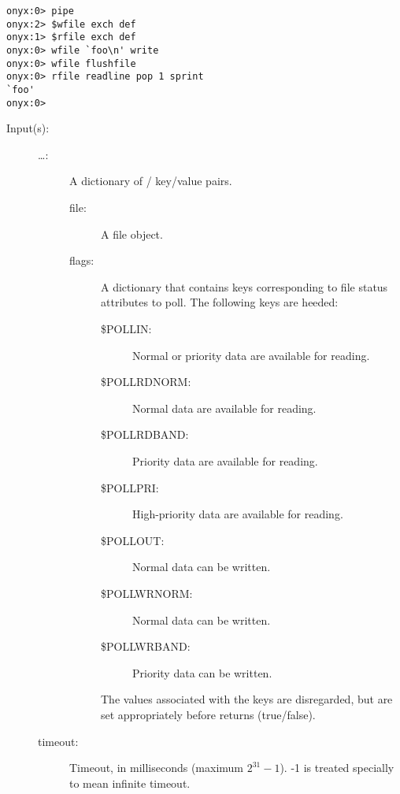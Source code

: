 \begin{description}
\begin{description}
\begin{verbatim}
onyx:0> pipe
onyx:2> $wfile exch def
onyx:1> $rfile exch def
onyx:0> wfile `foo\n' write
onyx:0> wfile flushfile
onyx:0> rfile readline pop 1 sprint
`foo'
onyx:0>
		\end{verbatim}
	\end{description}
\label{systemdict:poll}
\item[{\onyxop{{\lt}file flags \dots{\gt} timeout}{poll}{{\lb}file
      \dots{\rb}}}: ]
	\begin{description}\item[]
	\item[Input(s): ]
		\begin{description}\item[]
		\item[{\lt}\dots{\gt}: ]
			A dictionary of / key/value
			pairs.
			\begin{description}%
			\item[file: ]
				A file object.
			\item[flags: ]
				A dictionary that contains keys corresponding to
				file status attributes to poll.  The following
				keys are heeded:
				\begin{description}%
				\item[\$POLLIN: ]
					Normal or priority data are available
					for reading.
				\item[\$POLLRDNORM: ]
					Normal data are available for reading.
				\item[\$POLLRDBAND: ]
					Priority data are available for reading.
				\item[\$POLLPRI: ]
					High-priority data are available for
					reading.
				\item[\$POLLOUT: ]
					Normal data can be written.
				\item[\$POLLWRNORM: ]
					Normal data can be written.
				\item[\$POLLWRBAND: ]
					Priority data can be written.
				\end{description}
				The values associated with the keys are
				disregarded, but are set appropriately before
				 returns (true/false).
			\end{description}
		\item[timeout: ]
			Timeout, in milliseconds (maximum $2^{31} - 1$).  -1 is
			treated specially to mean infinite timeout.
		\end{description}

\end{description}
\end{description}
